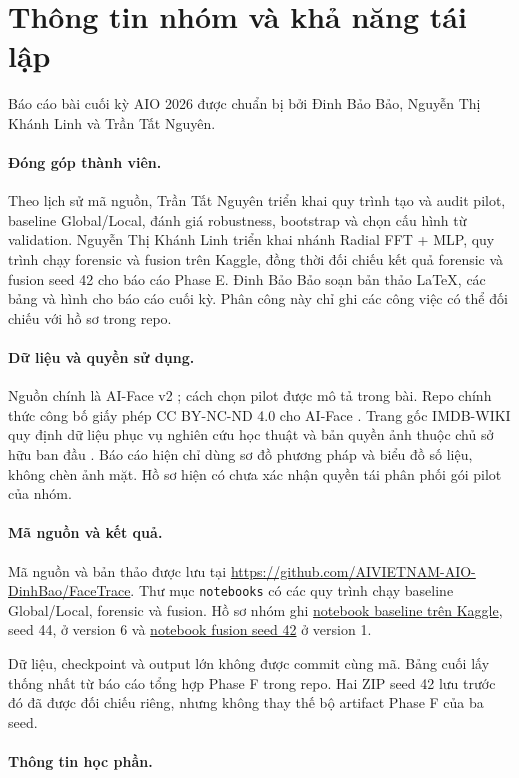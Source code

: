 \section*{Thông tin nhóm và khả năng tái lập}
Báo cáo bài cuối kỳ AIO 2026 được chuẩn bị bởi Đinh Bảo Bảo, Nguyễn Thị Khánh Linh và Trần Tất Nguyên.

\paragraph{Đóng góp thành viên.}
Theo lịch sử mã nguồn, Trần Tất Nguyên triển khai quy trình tạo và audit pilot, baseline Global/Local, đánh giá robustness, bootstrap và chọn cấu hình từ validation. Nguyễn Thị Khánh Linh triển khai nhánh Radial FFT + MLP, quy trình chạy forensic và fusion trên Kaggle, đồng thời đối chiếu kết quả forensic và fusion seed 42 cho báo cáo Phase E. Đinh Bảo Bảo soạn bản thảo LaTeX, các bảng và hình cho báo cáo cuối kỳ. Phân công này chỉ ghi các công việc có thể đối chiếu với hồ sơ trong repo.

\paragraph{Dữ liệu và quyền sử dụng.}
Nguồn chính là AI-Face v2 \cite{Lin_2025_CVPR}; cách chọn pilot được mô tả trong bài. Repo chính thức công bố giấy phép CC BY-NC-ND 4.0 cho AI-Face \cite{AI_Face_Repository}. Trang gốc IMDB-WIKI quy định dữ liệu phục vụ nghiên cứu học thuật và bản quyền ảnh thuộc chủ sở hữu ban đầu \cite{IMDB_WIKI_Source}. Báo cáo hiện chỉ dùng sơ đồ phương pháp và biểu đồ số liệu, không chèn ảnh mặt. Hồ sơ hiện có chưa xác nhận quyền tái phân phối gói pilot của nhóm.

\paragraph{Mã nguồn và kết quả.}
Mã nguồn và bản thảo được lưu tại \url{https://github.com/AIVIETNAM-AIO-DinhBao/FaceTrace}. Thư mục \texttt{notebooks} có các quy trình chạy baseline Global/Local, forensic và fusion. Hồ sơ nhóm ghi \href{https://www.kaggle.com/code/nguyentrann0703/ai-face-phase-e-global-local-baseline}{notebook baseline trên Kaggle}, seed 44, ở version 6 và \href{https://www.kaggle.com/code/nguyentrann0703/ai-face-phase-e-fusion-seed-42}{notebook fusion seed 42} ở version 1.

Dữ liệu, checkpoint và output lớn không được commit cùng mã. Bảng cuối lấy thống nhất từ báo cáo tổng hợp Phase F trong repo. Hai ZIP seed 42 lưu trước đó đã được đối chiếu riêng, nhưng không thay thế bộ artifact Phase F của ba seed.

\paragraph{Thông tin học phần.}
